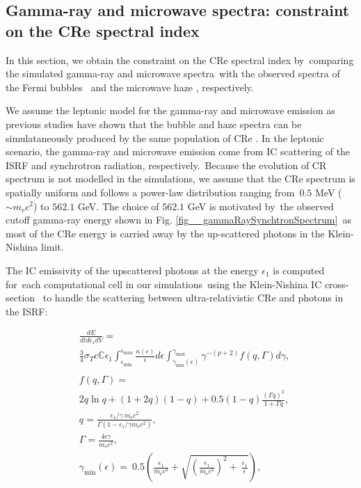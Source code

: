 \documentclass[fleqn,usenatbib,useAMS]{mnras}
\begin{document}
\subsection{Gamma-ray and microwave spectra: constraint on the CRe spectral index}
\label{sec:gamma-ray-microwave}
In this section, we obtain the constraint on the CRe spectral index by\
comparing the simulated gamma-ray and microwave spectra\
with the observed spectra of the Fermi bubbles \citep{Ackermann2014}\
and the microwave haze \citep{Dobler_2008}, respectively.\

We assume the leptonic model for the gamma-ray and microwave emission as previous studies have shown that the bubble and haze spectra can be simulataneously produced by the same population of CRe \citep{Su2010, Ackermann2014, Yang2022}. In the leptonic scenario, the gamma-ray and microwave emission come from IC scattering of the ISRF and synchrotron radiation, respectively.\
Because the evolution of CR spectrum is not modelled in the simulations, we assume that the CRe spectrum is spatially uniform and follows a power-law distribution ranging from\
$0.5$ MeV ($\sim m_{\text{e}}c^2$) to $562.1$ GeV. The choice of $562.1$ GeV is motivated by\
the observed cutoff gamma-ray energy shown in Fig. \ref{fig__gammaRaySynchtronSpectrum}\
as most of the CRe energy is carried away by the up-scattered photons in the Klein-Nishina limit.


The IC emissivity of the upscattered photons at the energy $\epsilon_{1}$ is computed for\
each computational cell in our simulations\
using the Klein-Nishina IC cross-section \citep{Jones1968,BLUMENTHAL1970}\
to handle the scattering between ultra-relativistic CRe and photons in the ISRF:

\begin{subequations}
  \begin{align}
  &\frac{dE}{dtd\epsilon_{1}dV} =\nonumber\\
               &\frac{3}{4}\sigma_{T}c\mathbb{C}\epsilon_{1}\int^{\epsilon_{\text{max}}}_{\epsilon_{\text{min}}}
               \frac{n(\epsilon)}{\epsilon}d\epsilon\int^{\gamma_{\text{max}}}_{\gamma_{\text{min}}\left(\epsilon\right)}
               \gamma^{-(p+2)}f(q, \Gamma)d\gamma,\\
  \nonumber\\
  &f(q, \Gamma) =\nonumber\\
               &2q\ln q+(1+2q)(1-q)+0.5(1-q)\frac{\left(\Gamma q\right)^2}{1+\Gamma q},\\
  &q=\frac{\epsilon_{1}/\gamma\
               m_{\text{e}}c^{2}}{\Gamma\left(1-\epsilon_{1}/\gamma m_{\text{e}}c^{2}\right)},\\
  &\Gamma=\frac{4\epsilon \gamma}{m_{\text{e}}c^2},\\
  &\gamma_{\text{min}}(\epsilon)=\
   0.5\left(\frac{\epsilon_{1}}{m_{\text{e}}c^2}+\sqrt{\left(\frac{\epsilon_{1}}{m_{\text{e}}c^2}\right)^2+\
   \frac{\epsilon_{1}}{\epsilon}}\right) \label{gamma-min},
  \end{align}
\label{gammaray-emissivity}
\end{subequations}
\end{document}
